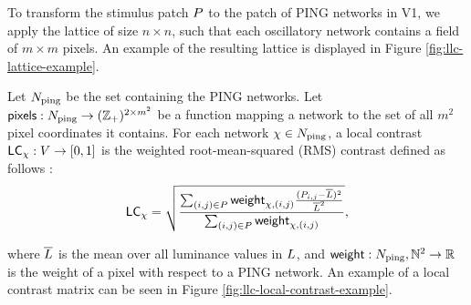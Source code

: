 To transform the stimulus patch $P$ to the patch of PING networks in V1, we apply the lattice of size $n \times n$, such that each oscillatory network contains a field of $m \times m$ pixels. An example of the resulting lattice is displayed in Figure \ref{fig:llc-lattice-example}.

Let $N_{\mathrm{ping}}$ be the set containing the PING networks. Let $\mathsf{pixels}: N_{\mathrm{ping}} \to (\mathbb{Z}_+)^{2 \times m^2}$ be a function mapping a network to the set of all $m^2$ pixel coordinates it contains.
For each network $\chi \in N_{\mathrm{ping}}$, a local contrast $\mathsf{LC}_\chi: V \to [0, 1]$ is the weighted root-mean-squared (RMS) contrast defined as follows \cite{Frazor2006}:
\begin{equation}
    \mathsf{LC}_\chi = \sqrt{
        \frac{
            \sum_{(i, j) \in P} \mathsf{weight}_{\chi, (i, j)} \frac{(P_{i, j} - \overline{L})^2}{\overline{L}^2}
        }{
            \sum_{(i, j) \in P} \mathsf{weight}_{\chi, (i, j)}
        }
    },
\end{equation}

where $\overline{L}$ is the mean over all luminance values in $L$, and $\mathsf{weight}: N_{\mathrm{ping}}, \mathbb{N}^2 \to \mathbb{R}$ is the weight of a pixel with respect to a PING network. An example of a local contrast matrix can be seen in Figure \ref{fig:llc-local-contrast-example}.

